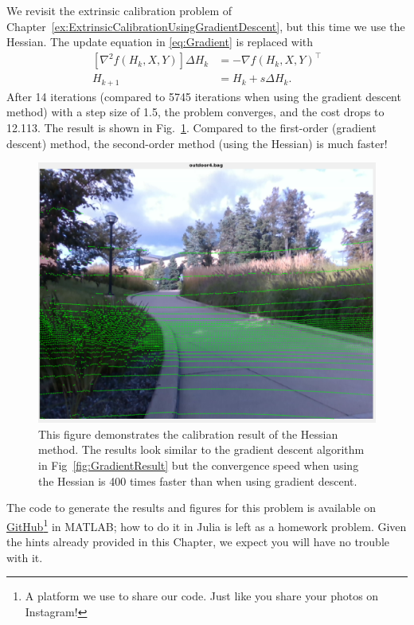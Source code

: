 \begin{example} We revisit the extrinsic calibration problem of Chapter~\ref{ex:ExtrinsicCalibrationUsingGradientDescent}, but this time we use the Hessian. The update equation in
\eqref{eq:Gradient} is replaced with
\begin{equation}
\begin{aligned}
\left[\nabla^2 f(H_k, X, Y)\right] \Delta H_k &=  -\nabla f(H_k, X, Y)^\top\\
    H_{k+1} &= H_k + s \Delta H_k.
\end{aligned}
\end{equation}
After 14 iterations (compared to 5745 iterations when using the gradient descent method) with a step size of 1.5, the problem converges, and the cost drops to 12.113. The result
is shown in Fig.~\ref{fig:HessianResult}. Compared to the first-order (gradient descent) method, the
second-order method (using the Hessian) is much faster!


\end{example}
\begin{figure}[hbt]%
    \centering
    \includegraphics[trim=0 0 0 30,clip,height=0.4\textwidth]{graphics/Chap12Optim/HessianResult.png}
\caption[]{This figure demonstrates the calibration result of the Hessian method. The results look similar to the gradient descent
algorithm in Fig~\ref{fig:GradientResult} but the
convergence speed when using the Hessian is 400 times faster than when using gradient descent.}
\label{fig:HessianResult}%
\end{figure}
The code to generate the results and figures for this problem is available on \href{https://github.com/UMich-BipedLab/ROB101-ExtrinsicCalibrationProblem.git}{GitHub}\footnote{A platform we use to share our code. Just like you share your photos on Instagram!} in MATLAB; how to do it in Julia is left as a homework problem. Given the hints already provided in this Chapter, we expect you will have no trouble with it.


